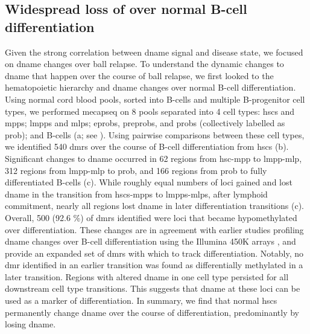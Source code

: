 
\subsection{Widespread loss of  over normal B-cell differentiation}

Given the strong correlation between \gls{dname} signal and disease state, we focused on \gls{dname} changes over \gls{ball} relapse.
To understand the dynamic changes to \gls{dname} that happen over the course of \gls{ball} relapse, we first looked to the hematopoietic hierarchy and \gls{dname} changes over normal B-cell differentiation.
Using normal cord blood pools, sorted into B-cells and multiple B-progenitor cell types, we performed \gls{mecapseq} on 8 pools separated into 4 cell types: \glspl{hsc} and \glspl{mpp}; \glspl{lmpp} and \glspl{mlp}; \glspl{eprob}, \glspl{preprob}, and \glspl{prob} (collectively labelled as \gls{prob}); and B-cells (a; see ).
Using pairwise comparisons between these cell types, we identified 540 \glspl{dmr} over the course of B-cell differentiation from \glspl{hsc} (b).
Significant changes to \gls{dname} occurred in 62 regions from \gls{hsc}-\gls{mpp} to \gls{lmpp}-\gls{mlp}, 312 regions from \gls{lmpp}-\gls{mlp} to \gls{prob}, and 166 regions from \gls{prob} to fully differentiated B-cells (c).
While roughly equal numbers of loci gained and lost \gls{dname} in the transition from \glspl{hsc}-\glspl{mpp} to \glspl{lmpp}-\glspl{mlp}, after lymphoid commitment, nearly all regions lost \gls{dname} in later differentiation transitions (c).
Overall, 500 (92.6 \%) of \glspl{dmr} identified were loci that became hypomethylated over differentiation.
These changes are in agreement with earlier studies profiling \gls{dname} changes over B-cell differentiation using the Illumina 450K arrays \cite{leeGlobalDNAMethylation2012,leeEpigeneticRemodelingBcell2015,nordlundGenomewideSignaturesDifferential2013}, and provide an expanded set of \glspl{dmr} with which to track differentiation.
Notably, no \gls{dmr} identified in an earlier transition was found as differentially methylated in a later transition.
Regions with altered \gls{dname} in one cell type persisted for all downstream cell type transitions.
This suggests that \gls{dname} at these loci can be used as a marker of differentiation.
In summary, we find that normal \glspl{hsc} permanently change \gls{dname} over the course of differentiation, predominantly by losing \gls{dname}.

